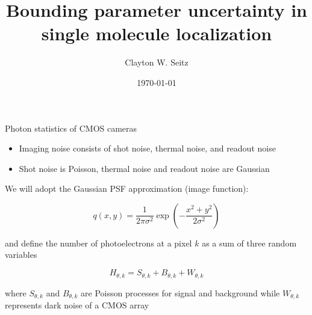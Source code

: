 \documentclass[aspectratio=1610]{beamer}					%
\title{Bounding parameter uncertainty in single molecule localization}	%
\author{Clayton W. Seitz}								%
\date{\today}									%
\begin{document}
\begin{frame}
  \titlepage
\end{frame}


%

\begin{frame}{Photon statistics of CMOS cameras}

\begin{itemize}
\item Imaging noise consists of shot noise, thermal noise, and readout noise
\vspace{0.1in}
\item Shot noise is Poisson, thermal noise and readout noise are Gaussian
\end{itemize}
\vspace{0.2in}

We will adopt the Gaussian PSF approximation (image function):

\begin{equation*}
q(x,y) = \frac{1}{2\pi\sigma^{2}}\exp\left(-\frac{x^{2}+y^{2}}{2\sigma^{2}}\right)
\end{equation*}

and define the number of photoelectrons at a pixel $k$ as a sum of three random variables

\begin{equation*}
H_{\theta,k} = S_{\theta,k} + B_{\theta,k} + W_{\theta,k}
\end{equation*}

where $S_{\theta,k}$ and $B_{\theta,k}$ are Poisson processes for signal and background while $W_{\theta,k}$ represents  dark noise of a CMOS array

\end{frame}
\end{document}
